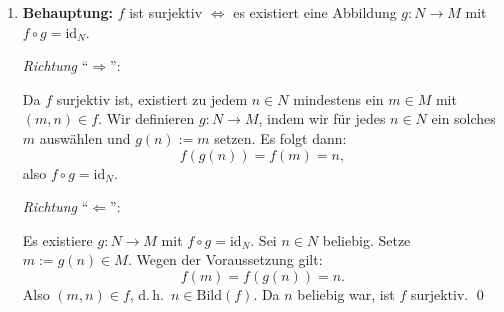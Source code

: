 \documentclass[a4paper,12pt]{article}
\begin{document}
\begin{enumerate}[label=\alph*)]
\item \textbf{Behauptung:} $f$ ist surjektiv $\Longleftrightarrow$ es existiert eine Abbildung $g: N \to M$ mit $f \circ g = \mathrm{id}_N$.

\medskip
\textit{Richtung} ``$\Rightarrow$'':

Da $f$ surjektiv ist, existiert zu jedem $n \in N$ mindestens ein $m \in M$ mit $(m, n) \in f$. Wir definieren $g: N \to M$, indem wir für jedes $n \in N$ ein solches $m$ auswählen und $g(n) := m$ setzen. Es folgt dann:
\[
  f(g(n)) = f(m) = n,
\]
also $f \circ g = \mathrm{id}_N$.

\medskip
\textit{Richtung} ``$\Leftarrow$'':

Es existiere $g: N \to M$ mit $f \circ g = \mathrm{id}_N$.
Sei $n \in N$ beliebig. Setze $m := g(n) \in M$. Wegen der Voraussetzung gilt:
\[
  f(m) = f(g(n)) = n.
\]
Also $(m, n) \in f$, d.\,h.\ $n \in \mathrm{Bild}(f)$. Da $n$ beliebig war, ist $f$ surjektiv. \qed

\end{enumerate}
\end{document}
